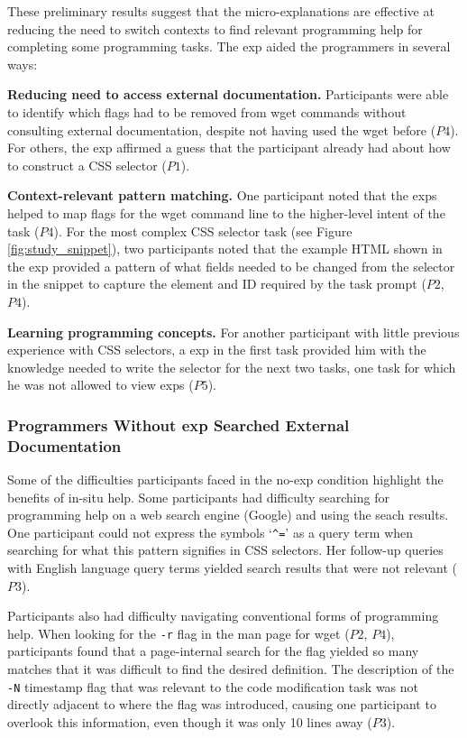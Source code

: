 

These preliminary results suggest that the micro-explanations are effective at reducing the need to switch contexts to find relevant programming help  for completing some programming tasks. 
The \gls{exp} aided the programmers in several ways:

{\bf Reducing need to access external documentation.}
Participants were  able to identify which flags had to be removed from wget commands without consulting external documentation, despite not having used the wget before ($P4$).
For others, the \gls{exp} affirmed a guess that the participant already had about how to construct a CSS selector ($P1$).

{\bf Context-relevant pattern matching.}
One participant noted that the \glspl{exp} helped  to map flags for the wget command line to the higher-level intent of the task ($P4$). 
For the most complex CSS selector task (see Figure \ref{fig:study_snippet}), two participants noted
that the example HTML shown in the \gls{exp} 
provided a pattern of what fields needed to be changed  from the selector in the snippet to capture the element and ID required by the task prompt ($P2$, $P4$).

{\bf Learning programming concepts.}
For another participant with little previous experience with CSS selectors, a \gls{exp} in  the first task provided him with the knowledge needed to write the selector for the next two tasks, one task for which he was not allowed to view \glspl{exp} ($P5$).

\subsubsection{Programmers Without \Gls{exp} Searched External Documentation}

Some of the difficulties participants faced in the no-\gls{exp} condition  highlight the benefits of in-situ help.
Some participants had difficulty searching for programming help on a web search engine (Google) and using the seach results.
One participant could not express the symbols `\texttt{\^{}=}' as a query term when searching for what  this pattern signifies in CSS selectors.
Her follow-up queries with English language query terms  yielded search results that were not relevant ($P3$).

Participants also had difficulty navigating conventional forms of programming help.
When looking for the \texttt{-r} flag in the man page for wget ($P2$, $P4$), participants found that a page-internal  search for the flag yielded so many matches that it was difficult to find the desired definition.
The description of the \texttt{-N} timestamp flag that was relevant to the code modification task was not directly adjacent to where the flag was introduced, causing one participant to overlook this information, even though it was only 10 lines away ($P3$).

